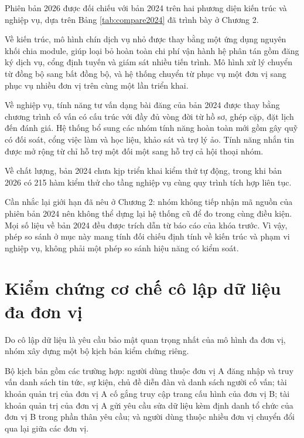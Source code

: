 \documentclass[12pt,a4paper,oneside]{report}
\begin{document}
Phiên bản 2026 được đối chiếu với bản 2024 trên hai phương diện kiến trúc và nghiệp vụ, dựa trên Bảng \ref{tab:compare2024} đã trình bày ở Chương 2.

Về kiến trúc, mô hình chín dịch vụ nhỏ được thay bằng một ứng dụng nguyên khối chia module, giúp loại bỏ hoàn toàn chi phí vận hành hệ phân tán gồm đăng ký dịch vụ, cổng định tuyến và giám sát nhiều tiến trình. Mô hình xử lý chuyển từ đồng bộ sang bất đồng bộ, và hệ thống chuyển từ phục vụ một đơn vị sang phục vụ nhiều đơn vị trên cùng một lần triển khai.

Về nghiệp vụ, tính năng tư vấn dạng bài đăng của bản 2024 được thay bằng chương trình cố vấn có cấu trúc với đầy đủ vòng đời từ hồ sơ, ghép cặp, đặt lịch đến đánh giá. Hệ thống bổ sung các nhóm tính năng hoàn toàn mới gồm gây quỹ có đối soát, cổng việc làm và học liệu, khảo sát và trợ lý ảo. Tính năng nhắn tin được mở rộng từ chỉ hỗ trợ một đối một sang hỗ trợ cả hội thoại nhóm.

Về chất lượng, bản 2024 chưa kịp triển khai kiểm thử tự động, trong khi bản 2026 có 215 hàm kiểm thử cho tầng nghiệp vụ cùng quy trình tích hợp liên tục.

Cần nhắc lại giới hạn đã nêu ở Chương 2: nhóm không tiếp nhận mã nguồn của phiên bản 2024 nên không thể dựng lại hệ thống cũ để đo trong cùng điều kiện. Mọi số liệu về bản 2024 đều được trích dẫn từ báo cáo của khóa trước. Vì vậy, phép so sánh ở mục này mang tính đối chiếu định tính về kiến trúc và phạm vi nghiệp vụ, không phải một phép so sánh hiệu năng có kiểm soát.

\section{Kiểm chứng cơ chế cô lập dữ liệu đa đơn vị}

Do cô lập dữ liệu là yêu cầu bảo mật quan trọng nhất của mô hình đa đơn vị, nhóm xây dựng một bộ kịch bản kiểm chứng riêng.

Bộ kịch bản gồm các trường hợp: người dùng thuộc đơn vị A đăng nhập và truy vấn danh sách tin tức, sự kiện, chủ đề diễn đàn và danh sách người cố vấn; tài khoản quản trị của đơn vị A cố gắng truy cập trang cấu hình của đơn vị B; tài khoản quản trị của đơn vị A gửi yêu cầu sửa dữ liệu kèm định danh tổ chức của đơn vị B trong phần thân yêu cầu; và người dùng thuộc nhiều đơn vị chuyển đổi qua lại giữa các đơn vị.
\end{document}

